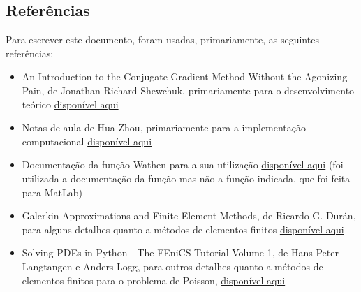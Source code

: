 \documentclass[11pt]{article}
\providecommand{\tightlist}{%
      \setlength{\itemsep}{0pt}\setlength{\parskip}{0pt}}
\begin{document}
    \subsection{Referências}\label{referuxeancias}

Para escrever este documento, foram usadas, primariamente, as seguintes
referências:

\begin{itemize}
\tightlist
\item
  An Introduction to the Conjugate Gradient Method Without the Agonizing
  Pain, de Jonathan Richard Shewchuk, primariamente para o
  desenvolvimento teórico
  \href{http://www.cs.cmu.edu/~quake-papers/painless-conjugate-gradient.pdf}{disponível
  aqui}
\item
  Notas de aula de Hua-Zhou, primariamente para a implementação
  computacional
  \href{http://hua-zhou.github.io/teaching/biostatm280-2019spring/slides/16-cg/cg.html}{disponível
  aqui}
\item
  Documentação da função Wathen para a sua utilização
  \href{http://www.netlib.org/templates/mltemplates.v1_1/wathen.m}{disponível
  aqui} (foi utilizada a documentação da função mas não a função
  indicada, que foi feita para MatLab)
\item
  Galerkin Approximations and Finite Element Methods, de Ricardo G.
  Durán, para alguns detalhes quanto a métodos de elementos finitos
  \href{http://mate.dm.uba.ar/~rduran/class_notes/fem.pdf}{disponível
  aqui}
\item
  Solving PDEs in Python - The FEniCS Tutorial Volume 1, de Hans Peter
  Langtangen e Anders Logg, para outros detalhes quanto a métodos de
  elementos finitos para o problema de Poisson,
  \href{https://fenicsproject.org/pub/tutorial/pdf/fenics-tutorial-vol1.pdf}{disponível
  aqui}
\end{itemize}


    
    
    
\end{document}
